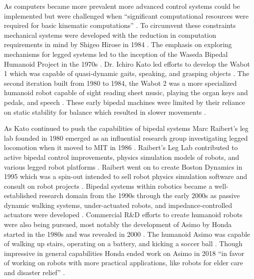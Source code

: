 \documentclass{article}
\begin{document}
As computers became more prevalent more advanced control systems could be implemented but were challenged when “significant computational resources were required for basic kinematic computations” \cite{kim2017}. To circumvent these constraints mechanical systems were developed with the reduction in computation requirements in mind by Shigeo Hirose in 1984 \cite{kim2017}. The emphasis on exploring mechanisms for legged systems led to the inception of the Waseda Bipedal Humanoid Project in the 1970s \cite{cyberne2012}. Dr. Ichiro Kato led efforts to develop the Wabot 1 which was capable of quasi-dynamic gaits, speaking, and grasping objects \cite{robots2018}. The second iteration built from 1980 to 1984, the Wabot 2 was a more specialized humanoid robot capable of sight reading sheet music, playing the organ keys and pedals, and speech \cite{waseda2024}. These early bipedal machines were limited by their reliance on static stability for balance which resulted in slower movements \cite{kim2017}. 

As Kato continued to push the capabilities of bipedal systems Marc Raibert’s leg lab founded in 1980 emerged as an influential research group investigating legged locomotion when it moved to MIT in 1986 \cite{mit2024}. Raibert’s Leg Lab contributed to active bipedal control improvements, physics simulation models of robots, and various legged robot platforms \cite{mit2024}. Raibert went on to create Boston Dynamics in 1995 which was a spin-out intended to sell robot physics simulation software and consult on robot projects \cite{knight2014}.  Bipedal systems within robotics became a well-established research domain from the 1990s through the early 2000s as passive dynamic walking systems, under-actuated robots, and impedance-controlled actuators were developed \cite{kim2017}. Commercial R\&D efforts to create humanoid robots were also being pursued, most notably the development of Asimo by Honda started in the 1980s and was revealed in 2000 \cite{hays2019}. The humanoid Asimo was capable of walking up stairs, operating on a battery, and kicking a soccer ball \cite{hays2019}. Though impressive in general capabilities Honda ended work on Asimo in 2018 “in favor of working on robots with more practical applications, like robots for elder care and disaster relief” \cite{ackerman2022}.
\end{document}
